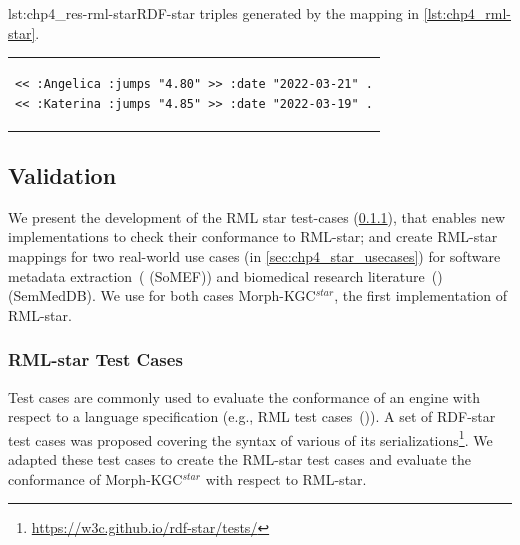 \noindent\hspace{0.1\linewidth}\begin{minipage}{\linewidth}
\begin{captionedlisting}{lst:chp4_res-rml-star}{RDF-star triples generated by the mapping in \cref{lst:chp4_rml-star}.}
\centering
\begin{tabular}{c}
\hspace{2em}
{\begin{lstlisting}[basicstyle=\ttfamily\small,label={list:example1},columns=flexible]
<< :Angelica :jumps "4.80" >> :date "2022-03-21" .
<< :Katerina :jumps "4.85" >> :date "2022-03-19" .
\end{lstlisting}}
\end{tabular}
\end{captionedlisting}
\end{minipage}







\subsection{Validation}
\label{sec:chp4_validation}

We present the development of the RML star test-cases (\cref{sec:chp4_star_testcases}), that enables new implementations to check their conformance to RML-star; and create RML-star mappings for two real-world use cases (in \cref{sec:chp4_star_usecases}) for software metadata extraction~(\cite{kelley2021framework} (SoMEF)) and biomedical research literature~(\cite{SemMedDB}) (SemMedDB). We use for both cases \mbox{Morph-KGC$^{star}$}, the first implementation of RML-star.




\subsubsection{RML-star Test Cases}
\label{sec:chp4_star_testcases}

Test cases are commonly used %
to evaluate the conformance of an engine with respect to a language specification (e.g., RML test cases~(\cite{heyvaert2019conformance})). 
A set of \mbox{RDF-star} test cases was proposed
covering the syntax of various of its serializations\footnote{\url{https://w3c.github.io/rdf-star/tests/}}.
We adapted these test cases to create the RML-star test cases and evaluate the conformance of \mbox{Morph-KGC$^{star}$}
with respect to \mbox{RML-star}.


